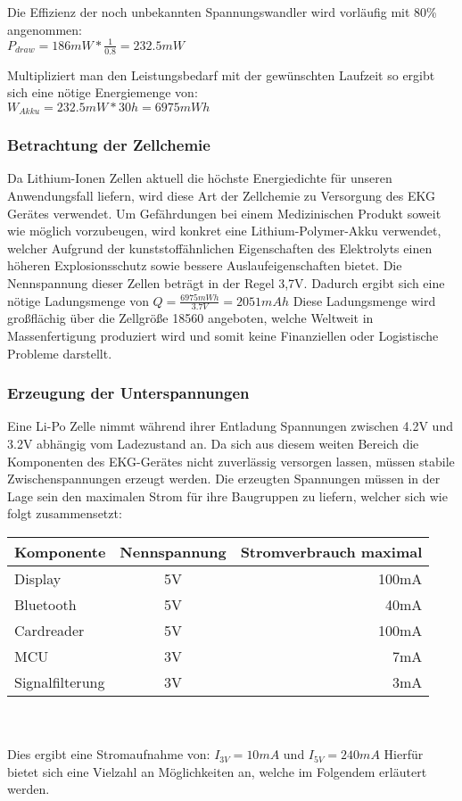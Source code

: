 Die Effizienz der noch unbekannten Spannungswandler wird vorläufig mit 80\% angenommen:\\
$P_{draw} = 186mW * \frac{1}{0.8} = 232.5mW $

Multipliziert man den Leistungsbedarf mit der gewünschten Laufzeit so ergibt sich eine nötige Energiemenge von:\\
$W_{Akku} = 232.5mW * 30h = 6975mWh$

\subsubsection{Betrachtung der Zellchemie}


Da Lithium-Ionen Zellen aktuell die höchste Energiedichte für unseren Anwendungsfall liefern, wird diese Art der Zellchemie zu Versorgung des EKG Gerätes verwendet. Um Gefährdungen bei einem Medizinischen Produkt soweit wie möglich vorzubeugen, wird konkret eine Lithium-Polymer-Akku verwendet, welcher Aufgrund der kunststoffähnlichen Eigenschaften des Elektrolyts einen höheren Explosionsschutz sowie bessere Auslaufeigenschaften bietet.
Die Nennspannung dieser Zellen beträgt in der Regel 3,7V. Dadurch ergibt sich eine nötige Ladungsmenge von 
$Q = \frac{6975mWh}{3.7V} = 2051mAh $
Diese Ladungsmenge wird großflächig über die Zellgröße 18560 angeboten, welche Weltweit in Massenfertigung produziert wird und somit keine Finanziellen oder Logistische Probleme darstellt.


\subsubsection{Erzeugung der Unterspannungen}

Eine Li-Po Zelle nimmt während ihrer Entladung Spannungen zwischen 4.2V und 3.2V abhängig vom Ladezustand an. Da sich aus diesem weiten Bereich die Komponenten des EKG-Gerätes nicht zuverlässig versorgen lassen, müssen stabile Zwischenspannungen erzeugt werden. Die erzeugten Spannungen müssen in der Lage sein den maximalen Strom für ihre Baugruppen zu liefern, welcher sich wie folgt zusammensetzt:\\

\begin{tabular}[h]{l|c|r}
Komponente & Nennspannung & Stromverbrauch maximal\\
\hline
Display & 5V & 100mA \\
Bluetooth & 5V & 40mA \\
Cardreader & 5V & 100mA \\
MCU & 3V & 7mA \\
Signalfilterung & 3V & 3mA \\
\end{tabular}
\\
\\
Dies ergibt eine Stromaufnahme von: $I_{3V} = 10mA$ und $I_{5V} = 240mA$
Hierfür bietet sich eine Vielzahl an Möglichkeiten an, welche im Folgendem erläutert werden.\\

